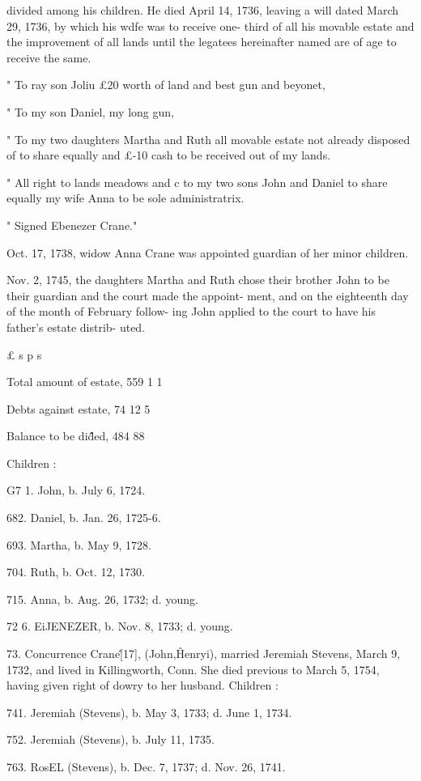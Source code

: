 divided among his children. He died April 14, 1736, leaving a 
will dated March 29, 1736, by which his wdfe was to receive one- 
third of all his movable estate and the improvement of all lands 
until the legatees hereinafter named are of age to receive the same. 

" To ray son Joliu £20 worth of land and best gun and beyonet, 

" To my son Daniel, my long gun, 

" To my two daughters Martha and Ruth all movable estate not already 
disposed of to share equally and £-10 cash to be received out of my lands. 

" All right to lands meadows and c to my two sons John and Daniel 
to share equally my wife Anna to be sole administratrix. 

" Signed Ebenezer Crane." 

Oct. 17, 1738, widow Anna Crane was appointed guardian of 
her minor children. 

Nov. 2, 1745, the daughters Martha and Ruth chose their 
brother John to be their guardian and the court made the appoint- 
ment, and on the eighteenth day of the month of February follow- 
ing John applied to the court to have his father's estate distrib- 
uted. 

£ s p s 

Total amount of estate, 559  1  1 

Debts against estate, 74  12  5 

Balance to be di\^\^ded, 484 88 

Children : 

G7 1. John, b. July 6, 1724. 

682. Daniel, b. Jan. 26, 1725-6. 

693. Martha, b. May 9, 1728. 

704. Ruth, b. Oct. 12, 1730. 

715. Anna, b. Aug. 26, 1732; d. young. 

72  6. EiJENEZER, b. Nov. 8, 1733; d. young. 

73. Concurrence Crane\^ [17], (John,\^ Henryi), married 
Jeremiah Stevens, March 9, 1732, and lived in Killingworth, 
Conn. She died previous to March 5, 1754, having given right 
of dowry to her husband. Children : 

741. Jeremiah (Stevens), b. May 3, 1733; d. June 1, 1734. 

752. Jeremiah (Stevens), b. July 11, 1735. 

763. RosEL (Stevens), b. Dec. 7, 1737; d. Nov. 26, 1741. 

